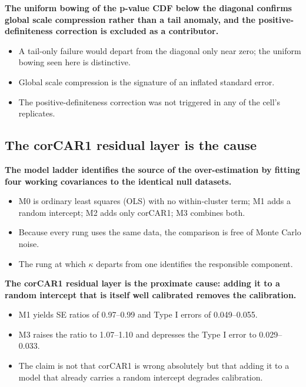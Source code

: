 \documentclass[
  11pt,
]{article}
\begin{document}
\textbf{The uniform bowing of the p-value CDF below the diagonal confirms global scale compression rather than a tail anomaly, and the positive-definiteness correction is excluded as a contributor.}

\begin{itemize}\setlength{\itemsep}{2pt}\setlength{\parskip}{0pt}
\item A tail-only failure would depart from the diagonal only near zero; the uniform bowing seen here is distinctive.
\item Global scale compression is the signature of an inflated standard error.
\item The positive-definiteness correction was not triggered in any of the cell's replicates.
\end{itemize}

\subsection{The corCAR1 residual layer is the cause}\label{the-corcar1-residual-layer-is-the-cause}

\textbf{The model ladder identifies the source of the over-estimation by fitting four working covariances to the identical null datasets.}

\begin{itemize}\setlength{\itemsep}{2pt}\setlength{\parskip}{0pt}
\item M0 is ordinary least squares (OLS) with no within-cluster term; M1 adds a random intercept; M2 adds only corCAR1; M3 combines both.
\item Because every rung uses the same data, the comparison is free of Monte Carlo noise.
\item The rung at which $\kappa$ departs from one identifies the responsible component.
\end{itemize}

\textbf{The corCAR1 residual layer is the proximate cause: adding it to a random intercept that is itself well calibrated removes the calibration.}

\begin{itemize}\setlength{\itemsep}{2pt}\setlength{\parskip}{0pt}
\item M1 yields SE ratios of 0.97--0.99 and Type I errors of 0.049--0.055.
\item M3 raises the ratio to 1.07--1.10 and depresses the Type I error to 0.029--0.033.
\item The claim is not that corCAR1 is wrong absolutely but that adding it to a model that already carries a random intercept degrades calibration.
\end{itemize}
\end{document}
